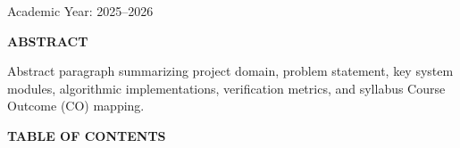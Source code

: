 \documentclass[12pt,a4paper]{report}
\newcommand{\AcademicYear}{2025--2026}
\begin{document}
\begin{titlepage}
\begin{center}
    \vfill
    {\fontsize{11}{14}\selectfont Academic Year: \AcademicYear}
\end{center}
\end{titlepage}

\newpage

\begin{center}
    {\fontsize{14}{16}\bfseries ABSTRACT}\\[1.5em]
\end{center}

Abstract paragraph summarizing project domain, problem statement, key system modules, algorithmic implementations, verification metrics, and syllabus Course Outcome (CO) mapping.

\newpage

\begin{center}
    {\fontsize{14}{16}\bfseries TABLE OF CONTENTS}\\[1.5em]
\end{center}
\end{document}
